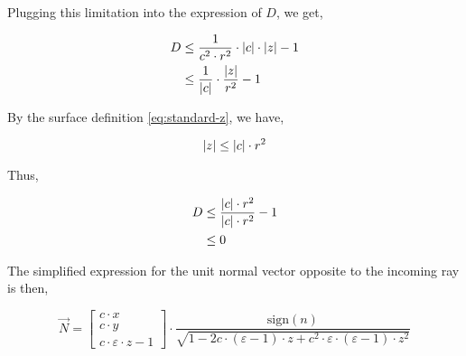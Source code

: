 Plugging this limitation into the expression of $D$, we get,

\begin{equation} \begin{split}
D &\leq \frac{1}{c^2 \cdot r^2} \cdot \abs{c} \cdot \abs{z} - 1 \\
  &\leq \frac{1}{\abs{c}} \cdot \frac{\abs{z}}{r^2} - 1
\end{split} \end{equation}

By the surface definition \cref{eq:standard-z}, we have,

\begin{equation}
\abs{z} \leq \abs{c} \cdot r^2
\end{equation}

Thus,

\begin{equation} \begin{split}
D &\leq \frac{\abs{c} \cdot r^2}{\abs{c} \cdot r^2} -1 \\
  &\leq 0
\end{split} \end{equation}

The simplified expression for the unit normal vector opposite to the incoming
ray is then,

\begin{equation}
\overrightarrow{N} =
\begin{bmatrix}
c \cdot x \\ c \cdot y \\ c \cdot \varepsilon \cdot z - 1
\end{bmatrix} \cdot
\frac{\textrm{sign}(n)}{
\sqrt{1 - 2 c \cdot (\varepsilon - 1) \cdot z + c^2 \cdot \varepsilon \cdot
         (\varepsilon - 1) \cdot z^2}}
\end{equation}

